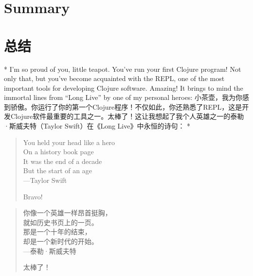 \begin{paracol}{2}
\section{Summary}
\switchcolumn
\section{总结}
\switchcolumn[0]*
I'm so proud of you, little teapot. You've run your first Clojure
program! Not only that, but you've become acquainted with the REPL, one
of the most important tools for developing Clojure software. Amazing! It
brings to mind the immortal lines from ``Long Live'' by one of my
personal heroes:
\switchcolumn
小茶壶，我为你感到骄傲。你运行了你的第一个Clojure程序！不仅如此，你还熟悉了REPL，这是开发Clojure软件最重要的工具之一。太棒了！这让我想起了我个人英雄之一的泰勒·斯威夫特（Taylor Swift）在《Long Live》中永恒的诗句：
\switchcolumn[0]*
\begin{quote}
You held your head like a hero\\
On a history book page\\
It was the end of a decade\\
But the start of an age\\

\hfill ---Taylor Swift

Bravo!
\end{quote}
\switchcolumn
\begin{quote}
你像一个英雄一样昂首挺胸，\\
就如历史书页上的一页。\\
那是一个十年的结束，\\
却是一个新时代的开始。\\

\hfill ---泰勒·斯威夫特

太棒了！
\end{quote}
\end{paracol}
